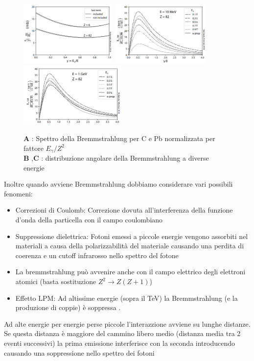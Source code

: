 \begin{figure}[H]
    \centering
    \includegraphics[height=3.2cm,frame]{Chapters/images/Interazione_radiazione_materia/image-20220220135143452.png}
    \includegraphics[height=3.2cm,frame]{Chapters/images/Interazione_radiazione_materia/image-20220220135223580.png}
    \includegraphics[height=3.2cm,frame]{Chapters/images/Interazione_radiazione_materia/image-20220220135322598.png}
    \captionsetup{width=0.9\linewidth}
    \caption{\textbf{A} : Spettro della Bremmstrahlung per C e Pb normalizzata per fattore $E_\gamma/Z^2$ \\ \textbf{B} ,\textbf{C} : distribuzione angolare della Bremmstrahlung a diverse energie}
    \label{fig:}
\end{figure}
Inoltre quando avviene Bremmstrahlung dobbiamo considerare vari possibili fenomeni:
\begin{itemize}
    \item Correzioni di Coulomb: Correzione dovuta all'interferenza della funzione d'onda della particella con il campo coulombiano

\item Suppressione dielettrica: Fotoni emessi a piccole energie vengono assorbiti nel materiali a causa della polarizzabilità del materiale causando una perdita di coerenza e un cutoff infrarosso nello spettro del fotone

\item La bremmstrahlung può avvenire anche con il campo elettrico degli elettroni atomici (basta sostituzione $Z^2 \to Z(Z+1)$)

\item Effetto LPM: Ad altissime energie (sopra il TeV) la Bremmstrahlung (e la produzione di coppie) è soppressa .
\end{itemize}
  Ad alte energie per energie perse piccole l'interazzione avviene su lunghe distanze. Se questa distanza è maggiore del cammino libero medio (distanza media tra 2 eventi successivi) la prima emissione interferisce con la seconda introducendo causando una soppressione nello spettro dei fotoni
